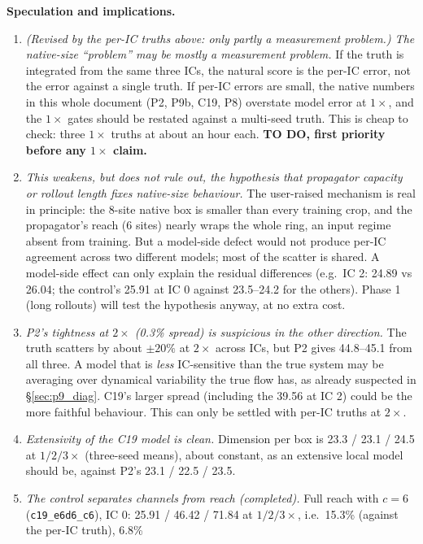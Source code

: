 \documentclass[11pt]{article}
\begin{document}
\textbf{Speculation and implications.}
\begin{enumerate}[leftmargin=*]
\item \emph{(Revised by the per-IC truths above: only partly a
  measurement problem.) The native-size ``problem'' may be mostly a measurement
  problem.} If the truth is integrated from the same three ICs, the
  natural score is the per-IC error, not the error against a single
  truth. If per-IC errors are small, the native numbers in this whole
  document (P2, P9b, C19, P8) overstate model error at $1\times$, and the
  $1\times$ gates should be restated against a multi-seed truth. This is
  cheap to check: three $1\times$ truths at about an hour each.
  \textbf{TO DO, first priority before any $1\times$ claim.}
\item \emph{This weakens, but does not rule out, the hypothesis that
  propagator capacity or rollout length fixes native-size behaviour.} The
  user-raised mechanism is real in principle: the 8-site native box is
  smaller than every training crop, and the propagator's reach (6 sites)
  nearly wraps the whole ring, an input regime absent from training.
  But a model-side defect would not produce per-IC agreement across two
  different models; most of the scatter is shared. A model-side effect
  can only explain the residual differences (e.g.\ IC 2: 24.89 vs 26.04;
  the control's 25.91 at IC 0 against 23.5--24.2 for the others). Phase 1
  (long rollouts) will test the hypothesis anyway, at no extra cost.
\item \emph{P2's tightness at $2\times$ (0.3\% spread) is suspicious in
  the other direction.} The truth scatters by about $\pm20\%$ at
  $2\times$ across ICs, but P2 gives 44.8--45.1 from all three. A model
  that is \emph{less} IC-sensitive than the true system may be averaging
  over dynamical variability the true flow has, as already suspected in
  \S\ref{sec:p9_diag}. C19's larger spread (including the 39.56 at IC 2)
  could be the more faithful behaviour. This can only be settled with
  per-IC truths at $2\times$.
\item \emph{Extensivity of the C19 model is clean.} Dimension per box
  is 23.3 / 23.1 / 24.5 at $1/2/3\times$ (three-seed means), about
  constant, as an extensive local model should be, against P2's 23.1 /
  22.5 / 23.5.
\item \emph{The control separates channels from reach (completed).}
  Full reach with $c{=}6$ (\texttt{c19\_e6d6\_c6}), IC 0: 25.91 / 46.42 /
  71.84 at $1/2/3\times$, i.e.\ 15.3\% (against the per-IC truth), 6.8\%

\end{enumerate}
\end{document}
